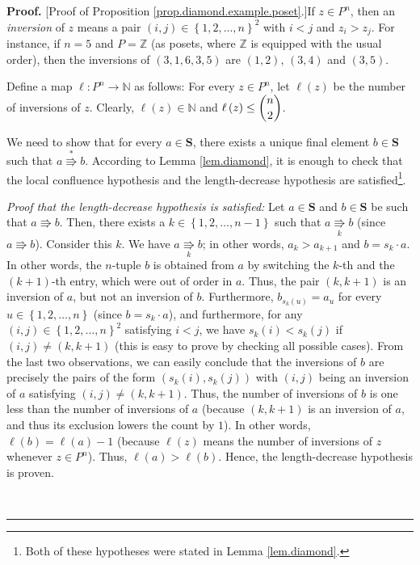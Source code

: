 \documentclass[numbers=enddot,12pt,final,onecolumn,notitlepage]{scrartcl}%
\theoremstyle{definition}
\newenvironment{proof}[1][Proof]{\noindent\textbf{#1.} }{\ \rule{0.5em}{0.5em}}
\newenvironment{vershort}{}{}
\begin{document}
\begin{proof}
[Proof of Proposition \ref{prop.diamond.example.poset}.]If $z\in P^{n}$, then
an \textit{inversion} of $z$ means a pair $\left(  i,j\right)  \in\left\{
1,2,\ldots,n\right\}  ^{2}$ with $i<j$ and $z_{i}>z_{j}$. For instance, if
$n=5$ and $P=\mathbb{Z}$ (as posets, where $\mathbb{Z}$ is equipped with the
usual order), then the inversions of $\left(  3,1,6,3,5\right)  $ are $\left(
1,2\right)  $, $\left(  3,4\right)  $ and $\left(  3,5\right)  $.

Define a map $\ell:P^{n}\rightarrow\mathbb{N}$ as follows: For every $z\in
P^{n}$, let $\ell\left(  z\right)  $ be the number of inversions of $z$.
Clearly, $\ell\left(  z\right)  \in\mathbb{N}$ and $\ell\left(  z\right)
\leq\dbinom{n}{2}$.

We need to show that for every $a\in\mathbf{S}$, there exists a unique final
element $b\in\mathbf{S}$ such that $a\overset{\ast}{\Rrightarrow}b$. According
to Lemma \ref{lem.diamond}, it is enough to check that the local confluence
hypothesis and the length-decrease hypothesis are satisfied\footnote{Both of
these hypotheses were stated in Lemma \ref{lem.diamond}.}.

\begin{vershort}
\textit{Proof that the length-decrease hypothesis is satisfied:} Let
$a\in\mathbf{S}$ and $b\in\mathbf{S}$ be such that $a\Rrightarrow b$. Then,
there exists a $k\in\left\{  1,2,\ldots,n-1\right\}  $ such that
$a\underset{k}{\Rrightarrow}b$ (since $a\Rrightarrow b$). Consider this $k$.
We have $a\underset{k}{\Rrightarrow}b$; in other words, $a_{k}>a_{k+1}$ and
$b=s_{k}\cdot a$. In other words, the $n$-tuple $b$ is obtained from $a$ by
switching the $k$-th and the $\left(  k+1\right)  $-th entry, which were out
of order in $a$. Thus, the pair $\left(  k,k+1\right)  $ is an inversion of
$a$, but not an inversion of $b$. Furthermore, $b_{s_{k}\left(  u\right)
}=a_{u}$ for every $u\in\left\{  1,2,\ldots,n\right\}  $ (since $b=s_{k}\cdot
a$), and furthermore, for any $\left(  i,j\right)  \in\left\{  1,2,\ldots
,n\right\}  ^{2}$ satisfying $i<j$, we have $s_{k}\left(  i\right)
<s_{k}\left(  j\right)  $ if $\left(  i,j\right)  \neq\left(  k,k+1\right)  $
(this is easy to prove by checking all possible cases). From the last two
observations, we can easily conclude that the inversions of $b$ are precisely
the pairs of the form $\left(  s_{k}\left(  i\right)  ,s_{k}\left(  j\right)
\right)  $ with $\left(  i,j\right)  $ being an inversion of $a$ satisfying
$\left(  i,j\right)  \neq\left(  k,k+1\right)  $. Thus, the number of
inversions of $b$ is one less than the number of inversions of $a$ (because
$\left(  k,k+1\right)  $ is an inversion of $a$, and thus its exclusion lowers
the count by $1$). In other words, $\ell\left(  b\right)  =\ell\left(
a\right)  -1$ (because $\ell\left(  z\right)  $ means the number of inversions
of $z$ whenever $z\in P^{n}$). Thus, $\ell\left(  a\right)  >\ell\left(
b\right)  $. Hence, the length-decrease hypothesis is proven.
\end{vershort}


\end{proof}
\end{document}
